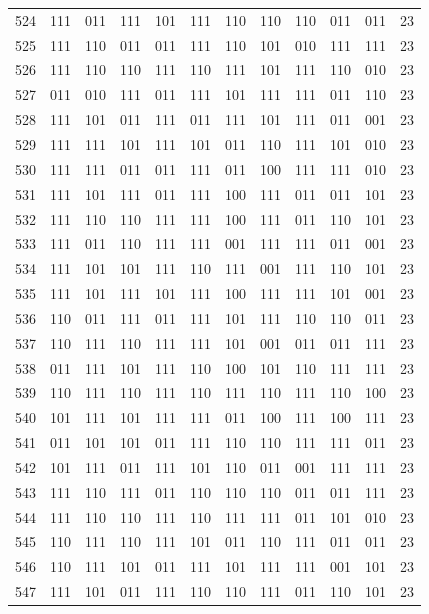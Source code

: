 \begin{longtable}{r*{10}{c}r}
524 & 111 & 011 & 111 & 101 & 111 & 110 & 110 & 110 & 011 & 011 & 23\\
525 & 111 & 110 & 011 & 011 & 111 & 110 & 101 & 010 & 111 & 111 & 23\\
526 & 111 & 110 & 110 & 111 & 110 & 111 & 101 & 111 & 110 & 010 & 23\\
527 & 011 & 010 & 111 & 011 & 111 & 101 & 111 & 111 & 011 & 110 & 23\\
528 & 111 & 101 & 011 & 111 & 011 & 111 & 101 & 111 & 011 & 001 & 23\\
529 & 111 & 111 & 101 & 111 & 101 & 011 & 110 & 111 & 101 & 010 & 23\\
530 & 111 & 111 & 011 & 011 & 111 & 011 & 100 & 111 & 111 & 010 & 23\\
531 & 111 & 101 & 111 & 011 & 111 & 100 & 111 & 011 & 011 & 101 & 23\\
532 & 111 & 110 & 110 & 111 & 111 & 100 & 111 & 011 & 110 & 101 & 23\\
533 & 111 & 011 & 110 & 111 & 111 & 001 & 111 & 111 & 011 & 001 & 23\\
534 & 111 & 101 & 101 & 111 & 110 & 111 & 001 & 111 & 110 & 101 & 23\\
535 & 111 & 101 & 111 & 101 & 111 & 100 & 111 & 111 & 101 & 001 & 23\\
536 & 110 & 011 & 111 & 011 & 111 & 101 & 111 & 110 & 110 & 011 & 23\\
537 & 110 & 111 & 110 & 111 & 111 & 101 & 001 & 011 & 011 & 111 & 23\\
538 & 011 & 111 & 101 & 111 & 110 & 100 & 101 & 110 & 111 & 111 & 23\\
539 & 110 & 111 & 110 & 111 & 110 & 111 & 110 & 111 & 110 & 100 & 23\\
540 & 101 & 111 & 101 & 111 & 111 & 011 & 100 & 111 & 100 & 111 & 23\\
541 & 011 & 101 & 101 & 011 & 111 & 110 & 110 & 111 & 111 & 011 & 23\\
542 & 101 & 111 & 011 & 111 & 101 & 110 & 011 & 001 & 111 & 111 & 23\\
543 & 111 & 110 & 111 & 011 & 110 & 110 & 110 & 011 & 011 & 111 & 23\\
544 & 111 & 110 & 110 & 111 & 110 & 111 & 111 & 011 & 101 & 010 & 23\\
545 & 110 & 111 & 110 & 111 & 101 & 011 & 110 & 111 & 011 & 011 & 23\\
546 & 110 & 111 & 101 & 011 & 111 & 101 & 111 & 111 & 001 & 101 & 23\\
547 & 111 & 101 & 011 & 111 & 110 & 110 & 111 & 011 & 110 & 101 & 23\\

\end{longtable}
